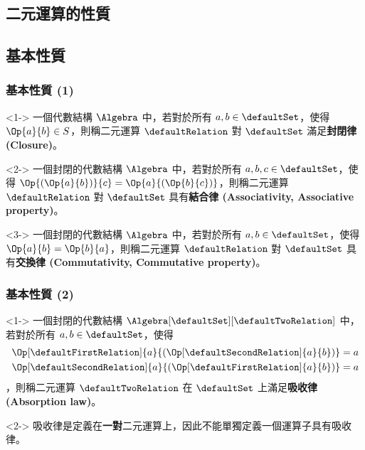 \documentclass[utf8]{beamer}
\begin{document}
\begin{CJK}{UTF8}{bkai}
\section{二元運算的性質}
\subsection{基本性質}

\begin{frame}
  \frametitle{基本性質 (1)}
  \begin{mydef}[封閉律]<1->
  \label{def:algebra:closure}
  一個代數結構 $\Algebra$ 中，若對於所有 $a,b\in{\defaultSet}$，使得 $\Op{a}{b}\in{S}$，則稱二元運算 $\defaultRelation$ 對 $\defaultSet$ 滿足\textbf{封閉律 (Closure)}。
  \end{mydef}
  \begin{mydef}[結合律]<2->
  \label{def:algebra:associativity}
  一個封閉的代數結構 $\Algebra$ 中，若對於所有 $a,b,c\in{\defaultSet}$，使得 $\Op{(\Op{a}{b})}{c}=\Op{a}{(\Op{b}{c})}$，則稱二元運算 $\defaultRelation$ 對 $\defaultSet$ 具有\textbf{結合律 (Associativity, Associative property)}。
  \end{mydef}
  \begin{mydef}[交換律]<3->
  \label{def:algebra:commutativity}
  一個封閉的代數結構 $\Algebra$ 中，若對於所有 $a,b\in{\defaultSet}$，使得 $\Op{a}{b}=\Op{b}{a}$，則稱二元運算 $\defaultRelation$ 對 $\defaultSet$ 具有\textbf{交換律 (Commutativity, Commutative property)}。
  \end{mydef}
\end{frame}

\begin{frame}
  \frametitle{基本性質 (2)}
  \begin{mydef}[吸收律]<1->
  \label{def:algebra:absorption_law}
  一個封閉的代數結構 $\Algebra[\defaultSet][\defaultTwoRelation]$ 中，若對於所有 $a,b\in{\defaultSet}$，使得
  \begin{align*}
  \Op[\defaultFirstRelation]{a}{({\Op[\defaultSecondRelation]{a}{b})}}=a\\
  \Op[\defaultSecondRelation]{a}{({\Op[\defaultFirstRelation]{a}{b})}}=a
  \end{align*}
  ，則稱二元運算 $\defaultTwoRelation$ 在 $\defaultSet$ 上滿足\textbf{吸收律 (Absorption law)}。
  \end{mydef}
  \begin{mynote*}<2->
  吸收律是定義在\textbf{一對}二元運算上，因此不能單獨定義一個運算子具有吸收律。
  \end{mynote*}
\end{frame}


\end{CJK}
\end{document}
